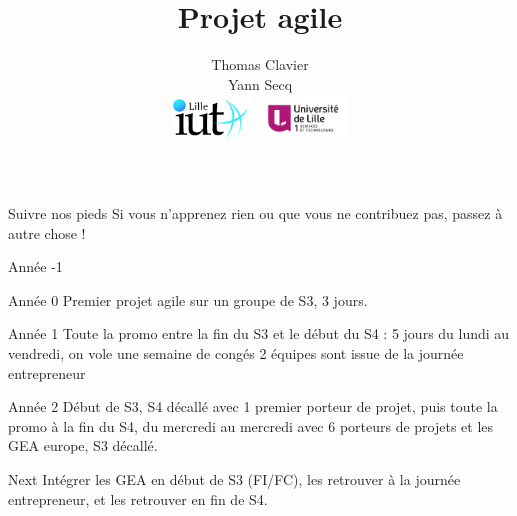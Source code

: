 \documentclass{beamer}
\title{Projet agile}
\author[Thomas Clavier, Yann Secq]
{
  Thomas Clavier \\
  Yann Secq \\
  \includegraphics[height=13mm]{logo_iut_A_Lille.jpg}
  \includegraphics[height=13mm]{Logo_Univ_de_Lille.jpg}
}
\date{\begin{center}30 juin 2016\end{center}}
\begin{document}
\frame{\titlepage}

\begin{frame}{Suivre nos pieds}
  \Large Si vous n’apprenez rien ou que vous ne contribuez pas, passez à autre chose !
\end{frame}

\begin{frame}{Année -1}
  
\end{frame}
\begin{frame}{Année 0}
  Premier projet agile sur un groupe de S3, 3 jours. 
\end{frame}
\begin{frame}{Année 1}
  Toute la promo entre la fin du S3 et le début du S4 : 5 jours du lundi au vendredi, on vole une semaine de congés
  2 équipes sont issue de la journée entrepreneur
\end{frame}
\begin{frame}{Année 2}
  Début de S3, S4 décallé avec 1 premier porteur de projet, puis toute la promo à la fin du S4, du mercredi au mercredi avec 6 porteurs de projets et les GEA europe, S3 décallé.
\end{frame}
\begin{frame}{Next}
  Intégrer les GEA en début de S3 (FI/FC), les retrouver à la journée entrepreneur, et les retrouver en fin de S4. 
\end{frame}
\end{document}
